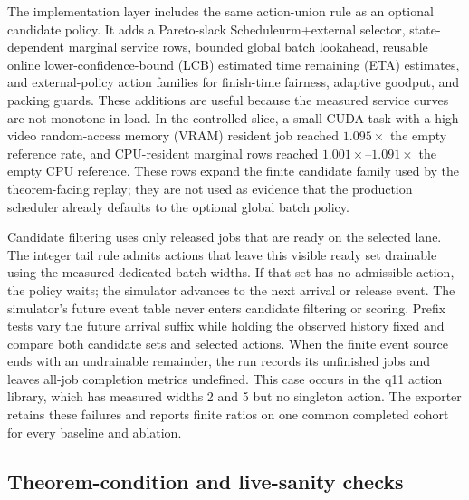 \documentclass[opre,dblanonrev]{informs4}
\begin{document}
The implementation layer includes the same action-union rule as an optional
candidate policy.  It adds a Pareto-slack Scheduleurm+external selector,
state-dependent marginal service rows, bounded global batch lookahead, reusable
online lower-confidence-bound (LCB) estimated time remaining (ETA) estimates,
and external-policy action families for finish-time fairness, adaptive goodput,
and packing guards.  These additions are useful because the measured service
curves are not monotone in load.  In the controlled slice, a small CUDA task
with a high video random-access memory (VRAM) resident job reached
\(1.095\times\) the empty reference rate, and CPU-resident marginal rows reached
\(1.001\times\)--\(1.091\times\) the empty CPU reference.  These rows expand the
finite candidate family used by the theorem-facing replay; they are not used as
evidence that the production scheduler already defaults to the optional global
batch policy.

Candidate filtering uses only released jobs that are ready on the selected
lane.  The integer tail rule admits actions that leave this visible ready set
drainable using the measured dedicated batch widths.  If that set has no
admissible action, the policy waits; the simulator advances to the next arrival
or release event.  The simulator's future event table never enters candidate
filtering or scoring.  Prefix tests vary the future arrival suffix while holding
the observed history fixed and compare both candidate sets and selected actions.
When the finite event source ends with an undrainable remainder, the run records
its unfinished jobs and leaves all-job completion metrics undefined.  This case
occurs in the q11 action library, which has measured widths 2 and 5 but no
singleton action.  The exporter retains these failures and reports finite
ratios on one common completed cohort for every baseline and ablation.

\subsection{Theorem-condition and live-sanity checks}
\label{subsec:condition-checks}
\end{document}
